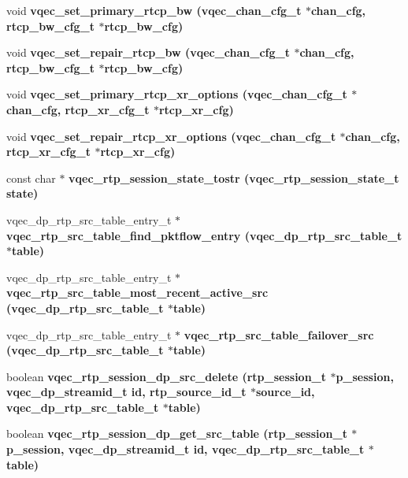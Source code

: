 \begin{CompactItemize}
\item 
void \bf{vqec\_\-set\_\-primary\_\-rtcp\_\-bw} (\bf{vqec\_\-chan\_\-cfg\_\-t} $\ast$chan\_\-cfg, rtcp\_\-bw\_\-cfg\_\-t $\ast$rtcp\_\-bw\_\-cfg)
\item 
void \bf{vqec\_\-set\_\-repair\_\-rtcp\_\-bw} (\bf{vqec\_\-chan\_\-cfg\_\-t} $\ast$chan\_\-cfg, rtcp\_\-bw\_\-cfg\_\-t $\ast$rtcp\_\-bw\_\-cfg)
\item 
void \bf{vqec\_\-set\_\-primary\_\-rtcp\_\-xr\_\-options} (\bf{vqec\_\-chan\_\-cfg\_\-t} $\ast$chan\_\-cfg, rtcp\_\-xr\_\-cfg\_\-t $\ast$rtcp\_\-xr\_\-cfg)
\item 
void \bf{vqec\_\-set\_\-repair\_\-rtcp\_\-xr\_\-options} (\bf{vqec\_\-chan\_\-cfg\_\-t} $\ast$chan\_\-cfg, rtcp\_\-xr\_\-cfg\_\-t $\ast$rtcp\_\-xr\_\-cfg)
\item 
const char $\ast$ \bf{vqec\_\-rtp\_\-session\_\-state\_\-tostr} (\bf{vqec\_\-rtp\_\-session\_\-state\_\-t} state)
\item 
vqec\_\-dp\_\-rtp\_\-src\_\-table\_\-entry\_\-t $\ast$ \bf{vqec\_\-rtp\_\-src\_\-table\_\-find\_\-pktflow\_\-entry} (vqec\_\-dp\_\-rtp\_\-src\_\-table\_\-t $\ast$table)
\item 
vqec\_\-dp\_\-rtp\_\-src\_\-table\_\-entry\_\-t $\ast$ \bf{vqec\_\-rtp\_\-src\_\-table\_\-most\_\-recent\_\-active\_\-src} (vqec\_\-dp\_\-rtp\_\-src\_\-table\_\-t $\ast$table)
\item 
vqec\_\-dp\_\-rtp\_\-src\_\-table\_\-entry\_\-t $\ast$ \bf{vqec\_\-rtp\_\-src\_\-table\_\-failover\_\-src} (vqec\_\-dp\_\-rtp\_\-src\_\-table\_\-t $\ast$table)
\item 
boolean \bf{vqec\_\-rtp\_\-session\_\-dp\_\-src\_\-delete} (rtp\_\-session\_\-t $\ast$p\_\-session, vqec\_\-dp\_\-streamid\_\-t id, rtp\_\-source\_\-id\_\-t $\ast$source\_\-id, vqec\_\-dp\_\-rtp\_\-src\_\-table\_\-t $\ast$table)
\item 
boolean \bf{vqec\_\-rtp\_\-session\_\-dp\_\-get\_\-src\_\-table} (rtp\_\-session\_\-t $\ast$p\_\-session, vqec\_\-dp\_\-streamid\_\-t id, vqec\_\-dp\_\-rtp\_\-src\_\-table\_\-t $\ast$table)
\end{CompactItemize}
